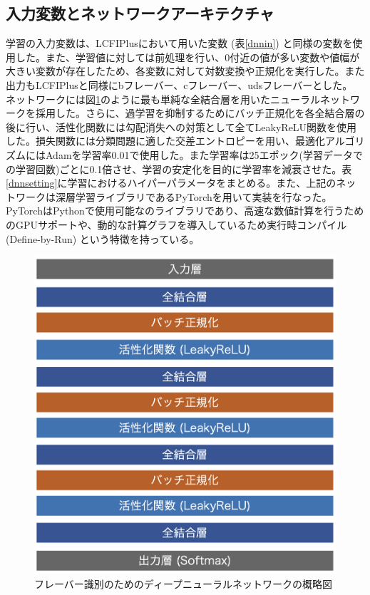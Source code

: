 \subsection{入力変数とネットワークアーキテクチャ}
学習の入力変数は、LCFIPlusにおいて用いた変数 (表\ref{dnnin}) と同様の変数を使用した。また、学習値に対しては前処理を行い、0付近の値が多い変数や値幅が大きい変数が存在したため、各変数に対して対数変換や正規化を実行した。また出力もLCFIPlusと同様にbフレーバー、cフレーバー、udsフレーバーとした。\\
ネットワークには図\ref{dnnmodel}のように最も単純な全結合層を用いたニューラルネットワークを採用した。さらに、過学習を抑制するためにバッチ正規化を各全結合層の後に行い、活性化関数には勾配消失への対策として全てLeakyReLU関数を使用した。損失関数には分類問題に適した交差エントロピーを用い、最適化アルゴリズムにはAdamを学習率0.01で使用した。また学習率は25エポック(学習データでの学習回数)ごとに0.1倍させ、学習の安定化を目的に学習率を減衰させた。表\ref{dnnsetting}に学習におけるハイパーパラメータをまとめる。また、上記のネットワークは深層学習ライブラリであるPyTorchを用いて実装を行なった。PyTorchはPythonで使用可能なのライブラリであり、高速な数値計算を行うためのGPUサポートや、動的な計算グラフを導入しているため実行時コンパイル (Define-by-Run) という特徴を持っている。
\begin{figure}[H]
	\begin{center}
 \includegraphics[keepaspectratio, scale=0.5]
 	{Figure/Flavortagging/dnn.png}
 		\caption{フレーバー識別のためのディープニューラルネットワークの概略図}
 		\label{dnnmodel}
	\end{center}
\end{figure}

